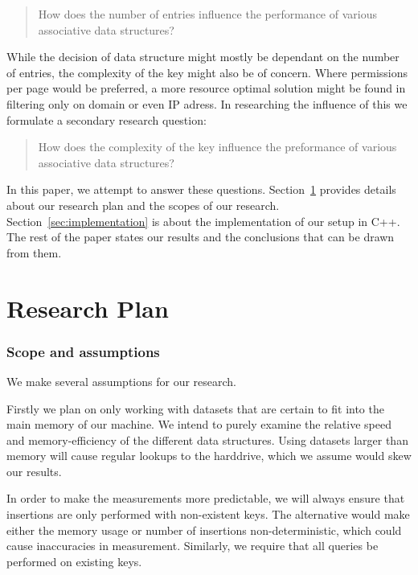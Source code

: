\documentclass[12pt,a4paper]{article}
\begin{document}
    \begin{quotation}
        How does the number of entries influence the performance of various associative data
        structures?
    \end{quotation}

    While the decision of data structure might mostly be dependant on the number of entries, the
    complexity of the key might also be of concern. Where permissions per page would be preferred, a
    more resource optimal solution might be found in filtering only on domain or even IP adress.  In
    researching the influence of this we formulate a secondary research question:

    \begin{quotation}
        How does the complexity of the key influence the preformance of various associative data structures?
    \end{quotation}

    In this paper, we attempt to answer these questions. Section~\ref{sec:plan} provides details
    about our research plan and the scopes of our research. Section~\ref{sec:implementation} is
    about the implementation of our setup in C++.  The rest of the paper states our results and the
    conclusions that can be drawn from them.

    \section{Research Plan}
    \label{sec:plan}

    \subsubsection*{Scope and assumptions}

    We make several assumptions for our research.

    Firstly we plan on only working with datasets that are certain to fit into the main memory of our machine. We intend to
    purely examine the relative speed and memory-efficiency of the different data structures. Using datasets larger than
    memory will cause regular lookups to the harddrive, which we assume would skew our results.

    In order to make the measurements more predictable, we will always ensure that insertions are only performed with
    non-existent keys. The alternative would make either the memory usage or number of insertions non-deterministic, which
    could cause inaccuracies in measurement. Similarly, we require that all queries be performed on existing keys.
\end{document}

